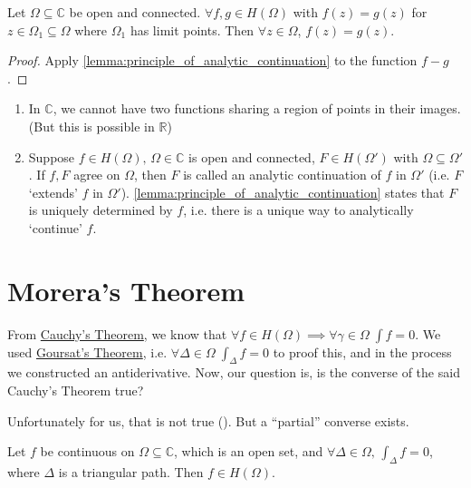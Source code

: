 \documentclass[11pt, oneside]{book}
\begin{document}
\begin{crly}\label{crly:uniqueness_of_a_function}
	Let $\Omega \subseteq \mathbb{C}$ be open and connected. $\forall f, g \in H(\Omega)$ with $f(z) = g(z)$ for $z \in \Omega_1 \subseteq \Omega$ where $\Omega_1$ has limit points. Then $\forall z \in \Omega$, $f(z) = g(z)$.
\end{crly}

\begin{proof}
	Apply \cref{lemma:principle_of_analytic_continuation} to the function $f - g$.
\end{proof}

\begin{remark}
	\begin{enumerate}
		\item In $\mathbb{C}$, we cannot have two functions sharing a region of points in their images. (But this is possible in $\mathbb{R}$)
		\item Suppose $f \in H(\Omega), \, \Omega \in \mathbb{C}$ is open and connected, $F \in H(\Omega')$ with $\Omega \subseteq \Omega'$. If $f, F$ agree on $\Omega$, then $F$ is called an analytic continuation of $f$ in $\Omega'$ (i.e. $F$ `extends' $f$ in $\Omega'$). \cref{lemma:principle_of_analytic_continuation} states that $F$ is uniquely determined by $f$, i.e. there is a unique way to analytically `continue' $f$.
	\end{enumerate}
\end{remark}


\section{Morera's Theorem} %
\label{sec:morera_s_theorem}

\begin{remark}[Recall]
	From \hyperref[thm:cauchy_s_theorem_for_convex_set]{Cauchy's Theorem}, we know that $\forall f \in H(\Omega) \implies \forall \gamma \in \Omega \; \int f = 0$. We used \hyperref[thm:goursat_s_theorem]{Goursat's Theorem}, i.e. $\forall \Delta \in \Omega \; \int_{\Delta} f = 0$ to proof this, and in the process we constructed an antiderivative. Now, our question is, is the converse of the said Cauchy's Theorem true?
\end{remark}
Unfortunately for us, that is not true (). But a ``partial'' converse exists.

\begin{thm}\label{thm:morera_s_theorem}
	Let $f$ be continuous on $\Omega \subseteq \mathbb{C}$, which is an open set, and $\forall \Delta \in \Omega, \, \int_{\Delta} f = 0$, where $\Delta$ is a triangular path. Then $f \in H(\Omega)$.
\end{thm}
\end{document}
